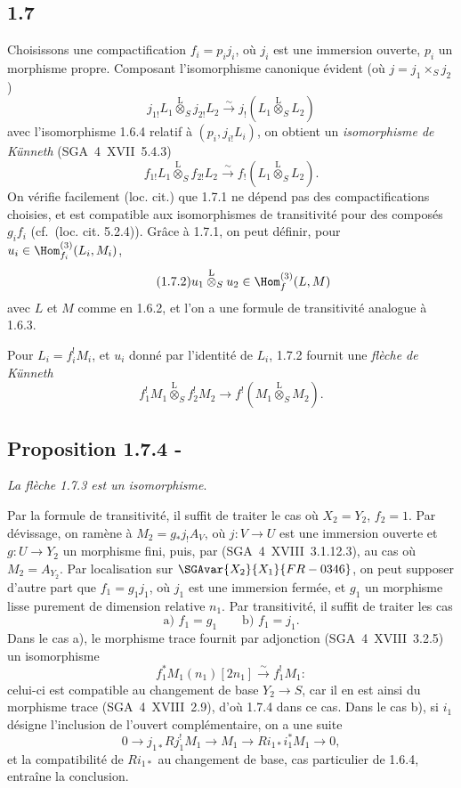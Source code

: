 \subsection*{1.7}
Choisissons une compactification $f_i=p_i j_i$, où $j_i$ est une immersion ouverte, $p_i$ un morphisme propre. Composant l'isomorphisme canonique évident (où $j=j_1\times_S j_2$)
\[
j_{1!}L_1\overset{\mathrm{L}}{\otimes}_{S}j_{2!}L_2\xrightarrow{\sim}j_{!}(L_1\overset{\mathrm{L}}{\otimes}_{S}L_2)
\]
avec l'isomorphisme 1.6.4 relatif à $(p_i,j_{i!}L_i)$, on obtient un \emph{isomorphisme de Künneth} (SGA~4~XVII~5.4.3)
\begin{equation}\tag{1.7.1}
f_{1!}L_1\overset{\mathrm{L}}{\otimes}_{S}f_{2!}L_2\xrightarrow{\sim}f_{!}(L_1\overset{\mathrm{L}}{\otimes}_{S}L_2).
\end{equation}
On vérifie facilement (loc. cit.) que 1.7.1 ne dépend pas des compactifications choisies, et est compatible aux isomorphismes de transitivité pour des composés $g_if_i$ (cf.~(loc. cit. 5.2.4)). Grâce à 1.7.1, on peut définir, pour $u_i\in\Hom_{f_i}^{(3)}(L_i,M_i)$,
\begin{equation}\tag{1.7.2}
u_1\overset{\mathrm{L}}{\otimes}_{S}u_2\in\Hom_f^{(3)}(L,M)
\end{equation}
avec $L$ et $M$ comme en 1.6.2, et l'on a une formule de transitivité analogue à 1.6.3.

Pour $L_i=f_i^{!}M_i$, et $u_i$ donné par l'identité de $L_i$, 1.7.2 fournit une \emph{flèche de Künneth}
\begin{equation}\tag{1.7.3}
f_1^{!}M_1\overset{\mathrm{L}}{\otimes}_{S}f_2^{!}M_2\longrightarrow f^{!}(M_1\overset{\mathrm{L}}{\otimes}_{S}M_2).
\end{equation}

\subsection*{Proposition 1.7.4 -}
\emph{La flèche 1.7.3 est un isomorphisme}.

Par la formule de transitivité, il suffit de traiter le cas où $X_2=Y_2$, $f_2=1$. Par dévissage, on ramène à $M_2=g_{*}j_{!}A_V$, où $j:V\to U$ est une immersion ouverte et $g:U\to Y_2$ un morphisme fini, puis, par (SGA~4~XVIII~3.1.12.3), au cas où $M_2=A_{Y_2}$. Par localisation sur $\SGAvar{X_2}{X_1}{FR-0346}$, on peut supposer d'autre part que $f_1=g_1j_1$, où $j_1$ est une immersion fermée, et $g_1$ un morphisme lisse purement de dimension relative $n_1$. Par transitivité, il suffit de traiter les cas
\[
\text{a) } f_1=g_1\qquad \text{b) } f_1=j_1.
\]
Dans le cas a), le morphisme trace fournit par adjonction (SGA~4~XVIII~3.2.5) un isomorphisme
\[
f_1^{*}M_1(n_1)[2n_1]\xrightarrow{\sim}f_1^{!}M_1 :
\]
celui-ci est compatible au changement de base $Y_2\to S$, car il en est ainsi du morphisme trace (SGA~4~XVIII~2.9), d'où 1.7.4 dans ce cas. Dans le cas b), si $i_1$ désigne l'inclusion de l'ouvert complémentaire, on a une suite 
\[
0\longrightarrow j_{1*}Rj_1^{!}M_1\longrightarrow M_1\longrightarrow Ri_{1*}i_1^{*}M_1\longrightarrow0,
\]
et la compatibilité de $Ri_{1*}$ au changement de base, cas particulier de 1.6.4, entraîne la conclusion.

